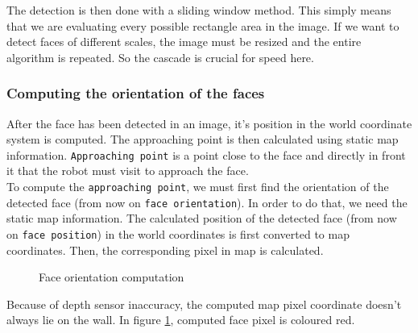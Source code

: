 \documentclass[12pt,a4paper]{article}
\begin{document}
	The detection is then done with a sliding window method. This simply means that we are evaluating every possible rectangle area in the image. If we want to detect faces of different scales, the image must be resized and the entire algorithm is repeated. So the cascade is crucial for speed here. \\
	
	\subsubsection{Computing the orientation of the faces} \label{face_orientation_computation}
	After the face has been detected in an image, it's position in the world coordinate system is computed. The approaching point is then calculated using static map information. \texttt{Approaching point} is a point close to the face and directly in front it that the robot must visit to approach the face. \\
	
	To compute the \texttt{approaching point}, we must first find the orientation of the detected face (from now on \texttt{face orientation}). In order to do that, we need the static map information.
	The calculated position of the detected face (from now on \texttt{face position}) in the world coordinates is first converted to map coordinates. Then, the corresponding pixel in map is calculated. \\
	
	\begin{figure}[h]
		\centering
		\caption{Face orientation computation}
		\label{fig:orientation_computation}
	\end{figure}
	
	Because of depth sensor inaccuracy, the computed map pixel coordinate doesn't always lie on the wall. In figure \ref{fig:orientation_computation}, computed face pixel is coloured red. \\ 
	
\end{document}
